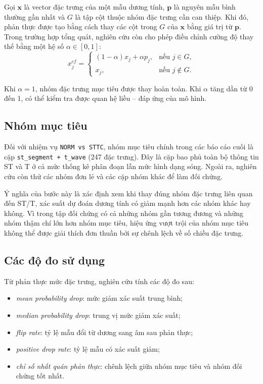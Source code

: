 \blocksep

Gọi $\mathbf{x}$ là vector đặc trưng của một mẫu dương tính, $\mathbf{p}$ là nguyên mẫu bình thường gần nhất và $G$ là tập cột thuộc nhóm đặc trưng cần can thiệp. Khi đó, phản thực được tạo bằng cách thay các cột trong $G$ của $\mathbf{x}$ bằng giá trị từ $\mathbf{p}$. Trong trường hợp tổng quát, nghiên cứu còn cho phép điều chỉnh cường độ thay thế bằng một hệ số $\alpha \in [0,1]$:
\[
x^{cf}_j =
\begin{cases}
(1-\alpha)x_j + \alpha p_j, & \text{nếu } j \in G,\\
x_j, & \text{nếu } j \notin G.
\end{cases}
\]

\blocksep

Khi $\alpha = 1$, nhóm đặc trưng mục tiêu được thay hoàn toàn. Khi $\alpha$ tăng dần từ 0 đến 1, có thể kiểm tra được quan hệ liều -- đáp ứng của mô hình.

\blocksep

\subsection{Nhóm mục tiêu}

\blocksep

Đối với nhiệm vụ \texttt{NORM vs STTC}, nhóm mục tiêu chính trong các báo cáo cuối là cặp \texttt{st\_segment + t\_wave} (247 đặc trưng). Đây là cặp bao phủ toàn bộ thông tin ST và T ở cả mức thống kê phân đoạn lẫn mức hình dạng sóng. Ngoài ra, nghiên cứu còn thử các nhóm đơn lẻ và các cặp nhóm khác để làm đối chứng.

\blocksep

Ý nghĩa của bước này là xác định xem khi thay đúng nhóm đặc trưng liên quan đến ST/T, xác suất dự đoán dương tính có giảm mạnh hơn các nhóm khác hay không. Vì trong tập đối chứng có cả những nhóm gần tương đương và những nhóm thậm chí lớn hơn nhóm mục tiêu, hiệu ứng vượt trội của nhóm mục tiêu không thể được giải thích đơn thuần bởi sự chênh lệch về số chiều đặc trưng.

\blocksep

\subsection{Các độ đo sử dụng}

\blocksep

Từ phản thực mức đặc trưng, nghiên cứu tính các độ đo sau:

\renewcommand{\labelitemi}{$+$}
\begin{itemize}
	\item \textit{mean probability drop}: mức giảm xác suất trung bình;
	\item \textit{median probability drop}: trung vị mức giảm xác suất;
	\item \textit{flip rate}: tỷ lệ mẫu đổi từ dương sang âm sau phản thực;
	\item \textit{positive drop rate}: tỷ lệ mẫu có xác suất giảm;
	\item \textit{chỉ số nhất quán phản thực}: chênh lệch giữa nhóm mục tiêu và nhóm đối chứng tốt nhất.
\end{itemize}

